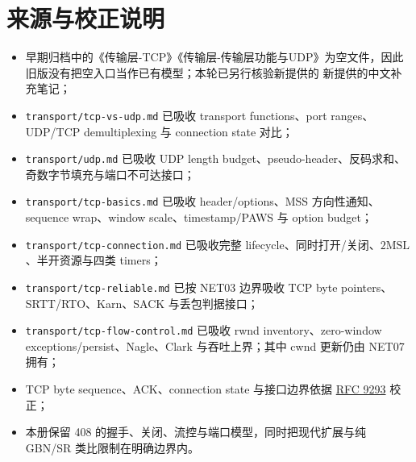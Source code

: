 \documentclass[UTF8,fontset=none,11pt,a4paper]{ctexart}
\providecommand{\tightlist}{\setlength{\itemsep}{0pt}\setlength{\parskip}{0pt}}
\providecommand{\passthrough}[1]{#1}
\begin{document}
\section{来源与校正说明}\label{16-ux6765ux6e90ux4e0eux6821ux6b63ux8bf4ux660e}

\begin{itemize}
\tightlist
\item
  早期归档中的《传输层-TCP》《传输层-传输层功能与UDP》为空文件，因此旧版没有把空入口当作已有模型；本轮已另行核验新提供的 新提供的中文补充笔记；
\item
  \passthrough{\lstinline!transport/tcp-vs-udp.md!} 已吸收 transport functions、port ranges、UDP/TCP demultiplexing 与 connection state 对比；
\item
  \passthrough{\lstinline!transport/udp.md!} 已吸收 UDP length budget、pseudo-header、反码求和、奇数字节填充与端口不可达接口；
\item
  \passthrough{\lstinline!transport/tcp-basics.md!} 已吸收 header/options、MSS 方向性通知、sequence wrap、window scale、timestamp/PAWS 与 option budget；
\item
  \passthrough{\lstinline!transport/tcp-connection.md!} 已吸收完整 lifecycle、同时打开/关闭、$2\mathrm{MSL}$、半开资源与四类 timers；
\item
  \passthrough{\lstinline!transport/tcp-reliable.md!} 已按 NET03 边界吸收 TCP byte pointers、SRTT/RTO、Karn、SACK 与丢包判据接口；
\item
  \passthrough{\lstinline!transport/tcp-flow-control.md!} 已吸收 rwnd inventory、zero-window exceptions/persist、Nagle、Clark 与吞吐上界；其中 cwnd 更新仍由 NET07 拥有；
\item
  TCP byte sequence、ACK、connection state 与接口边界依据
  \href{https://www.rfc-editor.org/rfc/rfc9293.html}{RFC 9293} 校正；
\item
  本册保留 408 的握手、关闭、流控与端口模型，同时把现代扩展与纯 GBN/SR
  类比限制在明确边界内。
\end{itemize}
\end{document}
